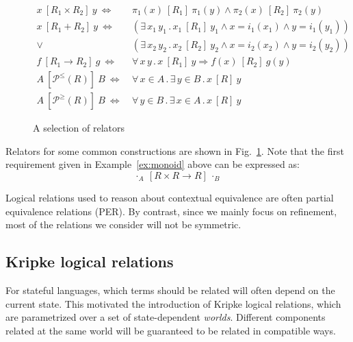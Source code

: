 \documentclass[acmsmall,timestamp,review,anonymous]{acmart}
\newcommand{\ifr}[1]{\ [{#1}]\ }
\begin{document}
\begin{figure} %
  {\small
  \begin{align*}
    x \ifr{R_1 \times R_2} y \ \Leftrightarrow\  &
      \pi_1(x) \ifr{R_1} \pi_1(y) \wedge
      \pi_2(x) \ifr{R_2} \pi_2(y) \\
    x \ifr{R_1 + R_2} y \ \Leftrightarrow\  &
      (\exists \, x_1 \, y_1 \,.\,
        x_1 \ifr{R_1} y_1 \wedge
        x = i_1(x_1) \wedge
        y = i_1(y_1)) \\ \vee\ &
      (\exists \, x_2 \, y_2 \,.\,
        x_2 \ifr{R_2} y_2 \wedge
        x = i_2(x_2) \wedge
        y = i_2(y_2)) \\
    f \ifr{R_1 \rightarrow R_2} g \ \Leftrightarrow\  &
      \forall \, x \, y \,.\,
        x \ifr{R_1} y \Rightarrow
        f(x) \ifr{R_2} g(y) \\
    A \ifr{\mathcal{P}^\le(R)} B \ \Leftrightarrow\  &
      \forall \, x \in A \,.\,
      \exists \, y \in B \,.\,
      x \ifr{R} y \\
    A \ifr{\mathcal{P}^\ge(R)} B \ \Leftrightarrow\  &
      \forall \, y \in B \,.\,
      \exists \, x \in A \,.\,
      x \ifr{R} y
  \end{align*}
  }%
  \caption{A selection of relators}
  \label{fig:relators}
\end{figure}

Relators for some common constructions are shown in Fig.~\ref{fig:relators}.
Note that the first requirement given in Example~\ref{ex:monoid} above
can be expressed as:
\[
  \cdot_A \ifr{R \times R \rightarrow R} \cdot_B
\]

Logical relations used to reason about contextual equivalence
are often partial equivalence relations (PER).
By contrast, since we mainly focus on refinement,
most of the relations we consider will not be symmetric.


\subsection{Kripke logical relations} %
\label{sec:klr}

For stateful languages,
which terms should be related
will often depend on the current state.
This motivated the introduction of Kripke logical relations,
which are parametrized over a set of state-dependent \emph{worlds}.
Different components related at the same world
will be guaranteed to be related in compatible ways.
\end{document}
